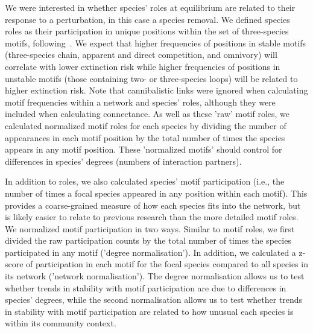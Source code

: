 \documentclass[12pt]{article}
\begin{document}
		We were interested in whether species' roles at equilibrium are related to their response to a perturbation, in this case a species removal. We defined species roles as their participation in unique positions within the set of three-species motifs, following~\citet{Stouffer2012,Cirtwill2015}. We expect that higher frequencies of positions in stable motifs (three-species chain, apparent and direct competition, and omnivory) will correlate with lower extinction risk while higher frequencies of positions in unstable motifs (those containing two- or three-species loops) will be related to higher extinction risk.	Note that cannibalistic links were ignored when calculating motif frequencies within a network and species' roles, although they were included when calculating connectance. As well as these 'raw' motif roles, we calculated normalized motif roles for each species by dividing the number of appearances in each motif position by the total number of times the species appears in any motif position. These 'normalized motifs' should control for differences in species' degrees (numbers of interaction partners).


		In addition to roles, we also calculated species' motif participation (i.e., the number of times a focal species appeared in any position within each motif). This provides a coarse-grained measure of how each species fits into the network, but is likely easier to relate to previous research than the more detailed motif roles. We normalized motif participation in two ways. Similar to motif roles, we first divided the raw participation counts by the total number of times the species participated in any motif ('degree normalisation'). In addition, we calculated a z-score of participation in each motif for the focal species compared to all species in its network ('network normalisation'). The degree normalisation allows us to test whether trends in stability with motif participation are due to differences in species' degrees, while the second normalisation allows us to test whether trends in stability with motif participation are related to how unusual each species is within its community context.
\end{document}
